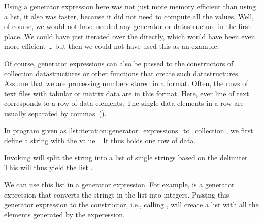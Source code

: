 Using a generator expression here was not just more memory efficient than using a list, it also was faster, because it did not need to compute all the values.
Well, of course, we would not have needed any generator or datastructure in the first place.
We could have just iterated over the  directly, which would have been even more efficient {\dots} but then we could not have used this as an example.

%
%
%
%
%
%
Of course, generator expressions can also be passed to the constructors of collection datastructures or other functions that create such datastructures.
Assume that we are processing numbers stored in a  format.
Often, the rows of text files with tabular or matrix data are in this format.
Here, ever line of text corresponds to a row of data elements.
The single data elements in a row are usually separated by commas~(\inQuotes{,}).

In program  given as \cref{lst:iteration:generator_expressions_to_collection}, we first define a string  with the value~.
It thus holds one row of  data.

Invoking  will split the string into a list of single strings based on the delimiter~\pythonil{\",\"}.
This will thus yield the list \pythonil{[\"22\", \"56\", \"33\", \"67\", \"43\", \"33\", \"12\"]}.

We can use this list in a generator expression.
For example,  is a generator expression that converts the strings in the list into integers.
Passing this generator expression to the  constructor, i.e., calling , will create a list with all the elements generated by the experession.

